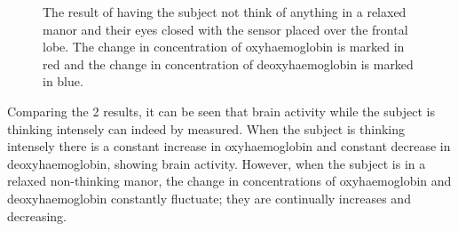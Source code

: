 \begin{figure}[htp]
\centering
{}
\caption[Frontal Lobe Measurements while Relaxed]{The result of having the subject not think of anything in a relaxed manor and their eyes closed with the sensor placed over the frontal lobe. The change in concentration of oxyhaemoglobin is marked in red and the change in concentration of deoxyhaemoglobin is marked in blue.}
\end{figure}

Comparing the 2 results, it can be seen that brain activity while the subject is thinking intensely can indeed by measured. When the subject is thinking intensely there is a constant increase in oxyhaemoglobin and constant decrease in deoxyhaemoglobin, showing brain activity. However, when the subject is in a relaxed non-thinking manor, the change in concentrations of oxyhaemoglobin and deoxyhaemoglobin constantly fluctuate; they are continually increases and decreasing.

